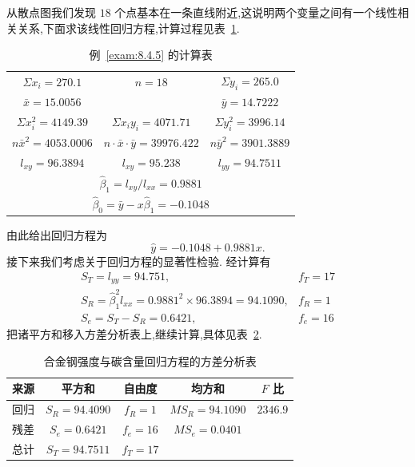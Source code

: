 \begin{example}
    从散点图我们发现 $18$ 个点基本在一条直线附近,这说明两个变量之间有一个线性相关关系,下面求该线性回归方程,计算过程见表~\ref{tab:8.4.5}.
    \begin{table}[htbp]
      \renewcommand*{\arraystretch}{1.5}
        \centering
        \caption{例~\ref{exam:8.4.5} 的计算表}
        \begin{tabular}{ccc}
          \toprule
         $\Sigma x_i=270.1$   &    $n=18$     &  $\Sigma y_i=265.0$  \\
         $\bar{x}=15.0056$   &       &  $\bar{y}=14.7222$  \\
         $\Sigma x_{i}^{2}=4149.39$   &    $\Sigma x_iy_i=4071.71$     &  $\Sigma y_{i}^{2}=3996.14$  \\
         $n\bar{x}^2=4053.0006$   &    $n \cdot\bar{x} \cdot \bar{y}=39976.422$     &  $n\bar{y}^2=3901.3889$  \\
         $l_{xy}=96.3894$   &    $l_{xy}=95.238$     &  $l_{yy}=94.7511$  \\
         \midrule
            \multicolumn{3}{c}{ $\hat{\beta}_1=l_{xy}/l_{xx}=0.9881$ } \\
            \multicolumn{3}{c}{ $\hat{\beta}_0=\bar{y}-x\hat{\beta}_1=-0.1048$ } \\
        \bottomrule
        \end{tabular}%
        \label{tab:8.4.5}%
    \end{table}%


    由此给出回归方程为
    \begin{equation}
    \hat{y}= - 0.1048 + 0.9881x. \label{eq:8.4.25}
    \end{equation}
    接下来我们考虑关于回归方程的显著性检验. 经计算有
    \begin{equation*}
    \begin{array}{ll}{S_{T}=l_{y y}=94.751,} & {f_{T}=17} \\ {S_{R}=\hat{\beta}_{1}^{2} l_{x x}=0.9881^{2} \times 96.3894=94.1090,} & {f_{R}=1} \\ {S_{e}=S_{T}-S_{R}=0.6421,} & {f_{e}=16}\end{array}
    \end{equation*}
    把诸平方和移入方差分析表上,继续计算,具体见表~\ref{tab:8.4.6}.
    \begin{table}[htbp]
        \centering
        \caption{合金钢强度与碳含量回归方程的方差分析表}
        \begin{tabular}{ccccc}
            \toprule
            来源    &  平方和  & 自由度   & 均方和   & $ F$ 比 \\\midrule %
            回归    &  $S_R=94.4090$  & $ f_R=1$   &  $MS_R=94.1090$  &  $2346.9$  \\
            残差    &  $S_e=0.6421$  &  $f_e=16$  &  $MS_e=0.0401$  &  \\\midrule
            总计    &  $S_T=94.7511$  &  $f_T=17$  &       &  \\\bottomrule
        \end{tabular}%
        \label{tab:8.4.6}%
    \end{table}%
    

\end{example}
